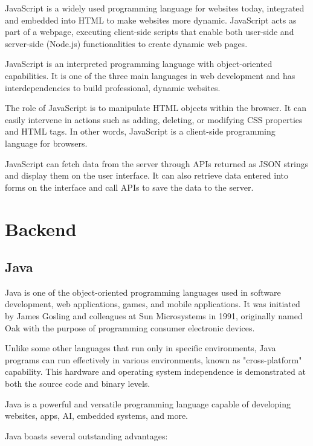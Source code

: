 \documentclass[../Main.tex]{subfiles}
\begin{document}
JavaScript is a widely used programming language for websites today, integrated and embedded into HTML to make websites more dynamic.
JavaScript acts as part of a webpage, executing client-side scripts that enable both user-side and server-side (Node.js) functionalities to create dynamic web pages.

JavaScript is an interpreted programming language with object-oriented capabilities.
It is one of the three main languages in web development and has interdependencies to build professional, dynamic websites.

The role of JavaScript is to manipulate HTML objects within the browser.
It can easily intervene in actions such as adding, deleting, or modifying CSS properties and HTML tags.
In other words, JavaScript is a client-side programming language for browsers.

JavaScript can fetch data from the server through APIs returned as JSON strings and display them on the user interface.
It can also retrieve data entered into forms on the interface and call APIs to save the data to the server.

\section{Backend}

\subsection{Java}

Java is one of the object-oriented programming languages used in software development, web applications, games, and mobile applications.
It was initiated by James Gosling and colleagues at Sun Microsystems in 1991, originally named Oak with the purpose of programming consumer electronic devices.

Unlike some other languages that run only in specific environments, Java programs can run effectively in various environments, known as "cross-platform" capability.
This hardware and operating system independence is demonstrated at both the source code and binary levels.

Java is a powerful and versatile programming language capable of developing websites, apps, AI, embedded systems, and more.

Java boasts several outstanding advantages:
\end{document}
